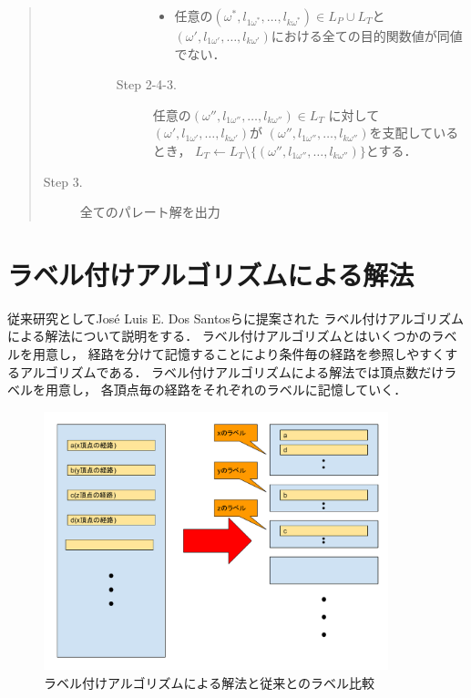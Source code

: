 \documentclass[12pt]{optlab-bachelor}
\begin{document}
\begin{quote}
\begin{description}
\begin{description}
\begin{description}
\begin{itemize}
          \item 任意の$(\omega^*,l_{1\omega^*},\ldots,l_{k\omega^*}) \in L_P \cup L_T$と
          $(\omega',l_{1\omega'},\ldots,l_{k\omega'})$における全ての目的関数値が同値でない．
        \end{itemize}
        \item[Step 2-4-3.] 任意の$(\omega'',l_{1\omega''},\ldots,l_{k\omega''})\in L_T$
        に対して$(\omega',l_{1\omega'},\ldots,l_{k\omega'})$が
        $(\omega'',l_{1\omega''},\ldots,l_{k\omega''})$を支配しているとき，
        $L_T \leftarrow L_T \setminus \{(\omega'',l_{1\omega''},\ldots,l_{k\omega''})\}$とする．
      \end{description}
    \end{description}
    \item[Step 3.] 全てのパレート解を出力
  \end{description}
\end{quote}

%

\section{ラベル付けアルゴリズムによる解法}
従来研究としてJosé Luis E. Dos Santosら\cite{Santos}に提案された
ラベル付けアルゴリズムによる解法について説明をする．
ラベル付けアルゴリズムとはいくつかのラベルを用意し，
経路を分けて記憶することにより条件毎の経路を参照しやすくするアルゴリズムである．
ラベル付けアルゴリズムによる解法では頂点数だけラベルを用意し，
各頂点毎の経路をそれぞれのラベルに記憶していく．

\begin{figure}[htbp]
  \centering
  \caption{ラベル付けアルゴリズムによる解法と従来とのラベル比較}
  \includegraphics[width=10.0cm]{fig/fig2.pdf}
\end{figure}
\end{document}
